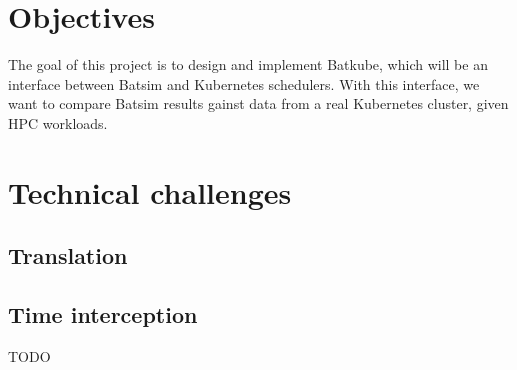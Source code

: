 \documentclass[12pt, a4paper]{memoir}
\begin{document}
\section{Objectives}

The goal of this project is to design and implement Batkube, which will be an
interface between Batsim and Kubernetes schedulers. With this interface, we
want to compare Batsim results gainst data from a real Kubernetes cluster,
given HPC workloads.

\section{Technical challenges}
\subsection{Translation}
\subsection{Time interception}
TODO

%
%
%
%	
%
%
%
\end{document}
